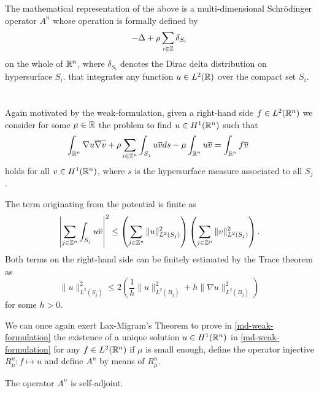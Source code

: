 The mathematical representation of the above is a multi-dimensional Schrödinger operator $A^{n}$ whose operation is formally defined by
\begin{equation}
	- \Delta + \rho \sum_{i \in \mathbb{Z}} \delta_{S_{i}} \label{md-the-operator-A-formally}
\end{equation}
on the whole of $\mathbb{R}^{n}$, where $\delta_{S_{i}}$ denotes the Dirac delta distribution on hypersurface $S_{i}$. that integrates any function $u \in L^{2}(\mathbb{R})$ over the compact set $S_{i}$.  %
~\\ ~\\ 
Again motivated by the weak-formulation, given a right-hand side $f \in L^{2}(\mathbb{R}^{n})$ we consider for some $\mu \in \mathbb{R}$ the problem to find $u \in H^{1}(\mathbb{R}^{n})$ such that
	\begin{equation}
		\int_{\R^{n}} \nabla u \overline{\nabla v} + \rho \sum_{i \in \Z^{n}} \int_{S_{j}} u \overline{v} ds - \mu \int_{\R^{n}} u \overline{v} = \int_{\R^{n}} f \overline{v} \label{md-weak-formulation}
	\end{equation} 
holds for all $v \in H^{1}(\mathbb{R}^{n})$, where $s$ is the hypersurface measure associated to all $S_{j}$. 

\begin{remark}
	The term originating from the potential is finite as
	\[ \left| \sum_{j \in \mathbb{Z}^{n}} \int_{S_{j}} u \overline{v} \right|^{2} \leq \left( \sum_{j \in \mathbb{Z}^{n}} \| u \|_{L^{2}(S_{j})}^{2} \right) \left( \sum_{j \in \mathbb{Z}^{n}} \| v \|_{L^{2}(S_{j})}^{2} \right). \] %
	Both terms on the right-hand side can be finitely estimated by the Trace theorem \cite[Chap. 5]{Evans98} as
	\[ \| u \|_{L^{2}(S_{j})}^{2} \leq 2 \left( \frac{1}{h} \|u\|_{L^{2}(B_{j})}^{2} + h \| \nabla u \|_{L^{2}(B_{j})}^{2} \right) \]
	for some $h > 0$. %
\end{remark}

We can once again exert Lax-Migram's Theorem to prove in \eqref{md-weak-formulation} the existence of a unique solution $u \in H^{1}(\mathbb{R}^{n})$ in \eqref{md-weak-formulation} for any $f \in L^{2}(\mathbb{R}^{n})$ if $\mu$ is small enough, define the operator injective $R_{\mu}^{n} \colon f \mapsto u$ and define $A^{n}$ by means of $R_{\mu}^{n}$.

\begin{remark}
	The operator $A^{n}$ is self-adjoint.	
\end{remark}

